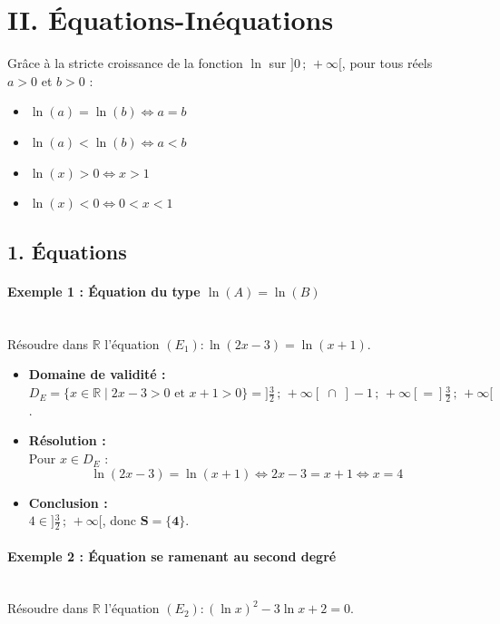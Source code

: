 \documentclass[12pt,a4paper]{article}
\begin{document}

\section*{\color{myred}II. Équations-Inéquations}
Grâce à la stricte croissance de la fonction $\ln$ sur $]0\,;\,+\infty[$, pour tous réels $a > 0$ et $b > 0$ :
\begin{itemize}
    \item $\ln(a) = \ln(b) \iff a = b$
    \item $\ln(a) < \ln(b) \iff a < b$
    \item $\ln(x) > 0 \iff x > 1$
    \item $\ln(x) < 0 \iff 0 < x < 1$
\end{itemize}

\subsection*{\color{myred}1. Équations}

\paragraph{Exemple 1 : Équation du type $\ln(A) = \ln(B)$}\mbox{}\\[2mm]
Résoudre dans $\mathbb{R}$ l'équation $(E_1) : \ln(2x - 3) = \ln(x + 1)$.

\begin{itemize}
    \item \textbf{Domaine de validité :}\\
    $D_E = \{x \in \mathbb{R} \mid 2x - 3 > 0 \text{ et } x + 1 > 0\} = ] \frac{3}{2} \,;\, +\infty[\; \cap \; ]-1 \,;\, +\infty[ = ]\frac{3}{2} \,;\, +\infty[$.
    \item \textbf{Résolution :}\\
    Pour $x \in D_E$ :
    \[
    \ln(2x - 3) = \ln(x + 1) \iff 2x - 3 = x + 1 \iff x = 4
    \]
    \item \textbf{Conclusion :}\\ $4 \in ]\frac{3}{2} \,;\, +\infty[$, donc $\mathbf{S = \{4\}}$.
\end{itemize}

\paragraph{Exemple 2 : Équation se ramenant au second degré}\mbox{}\\[2mm]
Résoudre dans $\mathbb{R}$ l'équation $(E_2) : (\ln x)^2 - 3\ln x + 2 = 0$.
\end{document}
